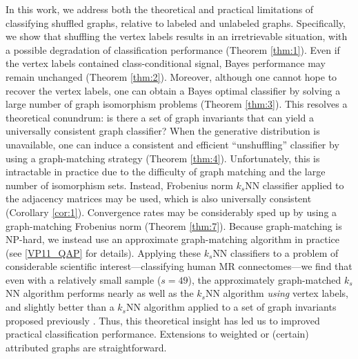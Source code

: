In this work, we address both the theoretical and practical limitations of classifying shuffled graphs, relative to labeled and unlabeled graphs.  Specifically, we show that shuffling the vertex labels results in an irretrievable situation, with a possible degradation of classification performance (Theorem \ref{thm:1}). Even if the vertex labels contained class-conditional signal, Bayes performance may remain unchanged (Theorem \ref{thm:2}).  Moreover, although one cannot hope to recover the vertex labels, one can obtain a Bayes optimal classifier by solving a large number of graph isomorphism problems (Theorem \ref{thm:3}).  This resolves a theoretical conundrum: is there a set of graph invariants that can yield a universally consistent graph classifier?  When the generative distribution is unavailable, one can induce a consistent and efficient ``unshuffling'' classifier by using a graph-matching strategy (Theorem \ref{thm:4}).  Unfortunately, this is intractable in practice due to the difficulty of graph matching and the large number of isomorphism sets.  Instead, Frobenius norm $k_s$NN classifier applied to the adjacency matrices may be used, which is also universally consistent (Corollary \ref{cor:1}).   Convergence rates may be considerably sped up by using a graph-matching Frobenius norm (Theorem \ref{thm:7}).  Because graph-matching is NP-hard, we instead use an approximate graph-matching algorithm in practice (see \ref{VP11_QAP} for details).  Applying these $k_s$NN classifiers to a problem of considerable scientific interest---classifying human MR connectomes---we find that even with a relatively small sample ($s=49$), the approximately graph-matched $k_s$NN algorithm performs nearly as well as the $k_s$NN algorithm \emph{using} vertex labels, and slightly better than a $k_s$NN algorithm applied to a set of graph invariants proposed previously \cite{PCP10}.  Thus, this theoretical insight has led us to improved practical classification performance.  Extensions to weighted or (certain) attributed graphs are straightforward.









